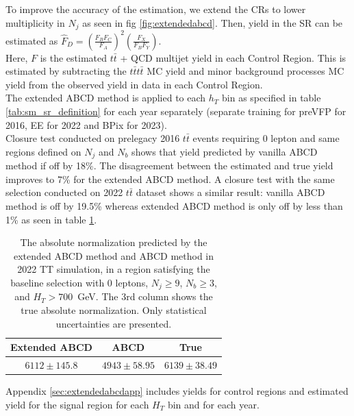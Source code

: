 \documentclass[twoside]{article}
\begin{document}
To improve the accuracy of the estimation, we extend the CRs to lower multiplicity in $N_j$ as seen in fig \ref{fig:extendedabcd}. Then, yield in the SR can be estimated as $\hat{F}_D = \left( \frac{F_B F_C}{F_A} \right)^2 \left( \frac{F_X}{F_B F_Y} \right)$.\\ Here, $F$ is the estimated $t\bar{t}$ + QCD multijet yield in each Control Region. This is estimated by subtracting the $t\bar{t}t\bar{t}$ MC yield and minor background processes MC yield from the observed yield in data in each Control Region.\\

The extended ABCD method is applied to each $h_T$ bin as specified in table \ref{tab:sm_sr_definition} for each year separately (separate training for preVFP for 2016, EE for 2022 and BPix for 2023).\\

Closure test conducted on prelegacy 2016 $t\bar{t}$ events requiring 0 lepton and same regions defined on $N_j$ and $N_b$ shows that yield predicted by vanilla ABCD method if off by 18\%. The disagreement between the estimated and true yield improves to 7\% for the extended ABCD method. A closure test with the same selection conducted on 2022 $t\bar{t}$ dataset shows a similar result: vanilla ABCD method is off by 19.5\% whereas extended ABCD method is only off by less than 1\% as seen in table \ref{tab:abcd_normalization}.\\

\begin{table}[h]
    \centering
    \begin{tabular}{|c|c|c|}
        \hline
        \textbf{Extended ABCD} & \textbf{ABCD} & \textbf{True} \\
        \hline
        $6112 \pm 145.8$ & $4943 \pm 58.95$ & $6139 \pm 38.49$ \\
        \hline
    \end{tabular}
    \caption{The absolute normalization predicted by the extended ABCD method and ABCD method in 2022 TT simulation, in a region satisfying the baseline selection with 0 leptons, $N_j \geq 9$, $N_b \geq 3$, and $H_T > 700$~GeV. The 3rd column shows the true absolute normalization. Only statistical uncertainties are presented.}
    \label{tab:abcd_normalization}
\end{table}

Appendix \ref{sec:extendedabcdapp} includes yields for control regions and estimated yield for the signal region for each $H_T$ bin and for each year.
\end{document}
